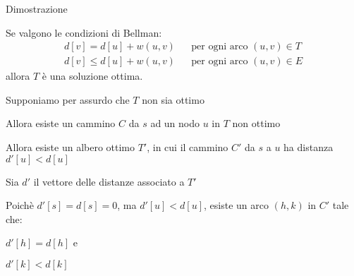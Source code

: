 \begin{frame}{Dimostrazione}

\vspace{-9pt}
\begin{myboxtitle}
Se valgono le condizioni di Bellman:
\begin{align*} 
d[v] = d[u] + w(u,v) && \textrm{per ogni arco $(u,v) \in T$}\\
d[v] \leq d[u] + w(u,v) && \textrm{per ogni arco $(u,v) \in E$}
\end{align*}
allora $T$ è una soluzione ottima.
\end{myboxtitle}

\small
\vspace{-4pt}
\begin{overprint}
\BI
\item Supponiamo per assurdo che $T$ non sia ottimo
\item Allora esiste un cammino $C$ da $s$ ad un nodo $u$ in $T$ non ottimo
\item Allora esiste un albero ottimo $T'$, in cui il cammino
$C'$ da $s$ a $u$ ha distanza $d'[u]<d[u]$
\item Sia $d'$ il vettore delle distanze associato a $T'$
\EI


\BI
\item Poichè $d'[s] = d[s] = 0$, ma $d'[u]<d[u]$, esiste un arco $(h,k)$ in $C'$ tale che:
\BI
\item $d'[h] = d[h]$ e 
\item $d'[k]< d[k]$
\EI
\EI

\begin{center}
\end{center}


\end{overprint}
\end{frame}
